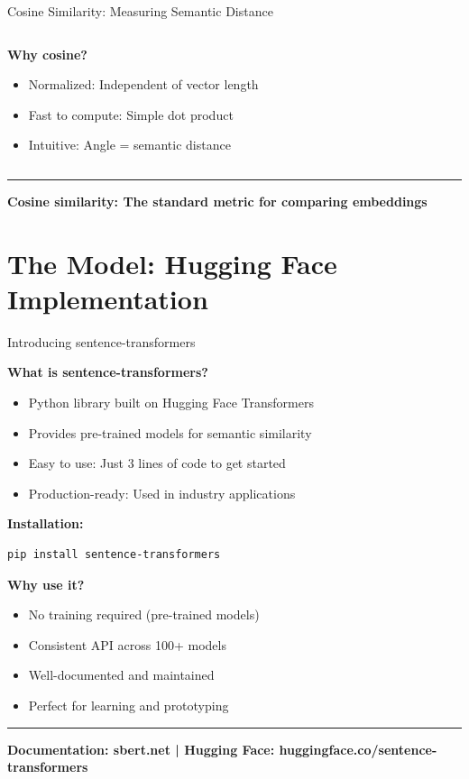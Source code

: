 \documentclass[8pt,aspectratio=169]{beamer}
\newcommand{\bottomnote}[1]{%
\vfill
\vspace{-2mm}
\textcolor{mllavender2}{\rule{\textwidth}{0.4pt}}
\vspace{1mm}
\footnotesize
\textbf{#1}
}
\begin{document}
\begin{frame}[t]{Cosine Similarity: Measuring Semantic Distance}
\begin{columns}[t]
\begin{column}{0.50\textwidth}
\vspace{0.5cm}

\textbf{Why cosine?}
\begin{itemize}
    \item Normalized: Independent of vector length
    \item Fast to compute: Simple dot product
    \item Intuitive: Angle = semantic distance
\end{itemize}
\end{column}
\end{columns}

\bottomnote{Cosine similarity: The standard metric for comparing embeddings}
\end{frame}

\section{The Model: Hugging Face Implementation}

\begin{frame}[t,fragile]{Introducing sentence-transformers}

\textbf{What is sentence-transformers?}

\begin{itemize}
    \item Python library built on Hugging Face Transformers
    \item Provides pre-trained models for semantic similarity
    \item Easy to use: Just 3 lines of code to get started
    \item Production-ready: Used in industry applications
\end{itemize}

\vspace{0.5cm}

\textbf{Installation:}

\begin{lstlisting}[language=bash]
pip install sentence-transformers
\end{lstlisting}

\vspace{0.5cm}

\textbf{Why use it?}
\begin{itemize}
    \item No training required (pre-trained models)
    \item Consistent API across 100+ models
    \item Well-documented and maintained
    \item Perfect for learning and prototyping
\end{itemize}

\bottomnote{Documentation: sbert.net | Hugging Face: huggingface.co/sentence-transformers}
\end{frame}
\end{document}
